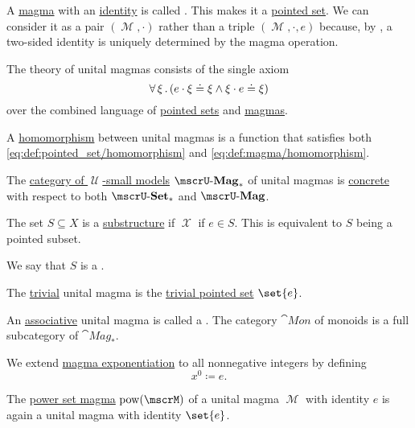 \begin{definition}\label{def:unital_magma}
  A \hyperref[def:magma]{magma} with an \hyperref[def:magma_identity]{identity} is called . This makes it a \hyperref[def:pointed_set]{pointed set}. We can consider it as a pair \( (\mscrM, \cdot) \) rather than a triple \( (\mscrM, \cdot, e) \) because, by , a two-sided identity is uniquely determined by the magma operation.

  \begin{thmenum}
     The theory of unital magmas consists of the single axiom
    \begin{equation}\label{eq:def:unital_magma/theory/identity}
      \forall \thinspace \xi \thinspace . \thinspace (e \cdot \xi \doteq \xi \wedge \xi \cdot e \doteq \xi)
    \end{equation}
    over the combined language of \hyperref[def:pointed_set/theory]{pointed sets} and \hyperref[def:magma/theory]{magmas}.

     A \hyperref[def:first_order_homomorphism]{homomorphism} between unital magmas is a function that satisfies both \eqref{eq:def:pointed_set/homomorphism} and \eqref{eq:def:magma/homomorphism}.

     The \hyperref[def:category_of_small_first_order_models]{category of \( \mscrU \)-small models} \( \ucat{Mag}_* \) of unital magmas is \hyperref[def:concrete_category]{concrete} with respect to both \hyperref[def:pointed_set/category]{\( \ucat{Set}_* \)} and \hyperref[def:magma/category]{\( \ucat{Mag} \)}.

     The set \( S \subseteq X \) is a \hyperref[def:first_order_substructure]{substructure} if \( \mscrX \) if \( e \in S \). This is equivalent to \( S \) being a pointed subset.

    We say that \( S \) is a .

     The \hyperref[thm:substructures_form_complete_lattice/bottom]{trivial} unital magma is the \hyperref[def:pointed_set/trivial]{trivial pointed set} \( \set{ e } \).

     An \hyperref[eq:def:magma/associative]{associative} unital magma is called a . The category \( \cat{Mon} \) of monoids is a full subcategory of \( \cat{Mag}_* \).

     We extend \hyperref[def:magma/exponentiation]{magma exponentiation} to all nonnegative integers by defining
    \begin{equation*}
      x^0 \coloneqq e.
    \end{equation*}

     The \hyperref[def:magma/power_set]{power set magma} \( \pow(\mscrM) \) of a unital magma \( \mscrM \) with identity \( e \) is again a unital magma with identity \( \set{ e } \).
  \end{thmenum}
\end{definition}

